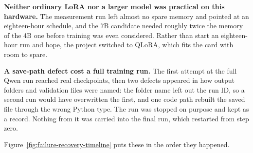\textbf{Neither ordinary LoRA nor a larger model was practical on this hardware.} The measurement run left almost no spare memory and pointed at an eighteen-hour schedule, and the 7B candidate needed roughly twice the memory of the 4B one before training was even considered. Rather than start an eighteen-hour run and hope, the project switched to QLoRA, which fits the card with room to spare.

\textbf{A save-path defect cost a full training run.} The first attempt at the full Qwen run reached real checkpoints, then two defects appeared in how output folders and validation files were named: the folder name left out the run ID, so a second run would have overwritten the first, and one code path rebuilt the saved file through the wrong Python type. The run was stopped on purpose and kept as a record. Nothing from it was carried into the final run, which restarted from step zero.

Figure~\ref{fig:failure-recovery-timeline} puts these in the order they happened.


